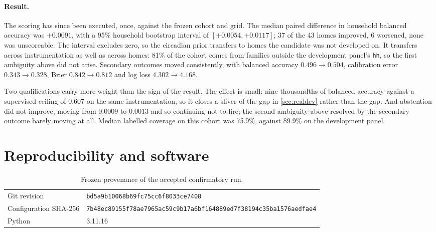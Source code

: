 \documentclass[11pt]{article}
\begin{document}
\paragraph{Result.}
The scoring has since been executed, once, against the frozen cohort and grid.
The median paired difference in household balanced accuracy was $+0.0091$, with
a 95\% household bootstrap interval of $[+0.0054, +0.0117]$; 37 of the 43 homes
improved, 6 worsened, none was unscoreable. The interval excludes zero, so the
circadian prior transfers to homes the candidate was not developed on. It
transfers across instrumentation as well as across homes: 81\% of the cohort
comes from families outside the development panel's \texttt{hh}, so the first
ambiguity
above did not arise. Secondary outcomes moved consistently, with balanced
accuracy $0.496\to0.504$, calibration error $0.343\to0.328$, Brier
$0.842\to0.812$ and log loss $4.302\to4.168$.

Two qualifications carry more weight than the sign of the result. The effect is
small: nine thousandths of balanced accuracy against a supervised ceiling of
0.607 on the same instrumentation, so it closes a sliver of the gap in
\cref{sec:realdev} rather than the gap. And abstention did not improve, moving
from $0.0009$ to $0.0013$ and so continuing not to fire; the second ambiguity
above resolved by the secondary outcome barely moving at all. Median labelled
coverage on this cohort was 75.9\%, against 89.9\% on the development panel.

\section{Reproducibility and software}


\begin{table}[h]
\centering
\small
\caption{Frozen provenance of the accepted confirmatory run.}
\label{tab:provenance}
\begin{tabular}{@{}l p{7.2cm}@{}}
\toprule
Git revision & \texttt{bd5a9b10\allowbreak 068b69fc\allowbreak 75cc6f80\allowbreak 69044306\allowbreak 33ce7408} \\
Configuration SHA-256 & \texttt{7b48ec89\allowbreak 155f78ae\allowbreak 7965ac59\allowbreak c9b17a6b\allowbreak f164889e\allowbreak d7f38194\allowbreak c35ba157\allowbreak 6aedfae4} \\
Python & 3.11.16 \\
\bottomrule
\end{tabular}
\end{table}
\end{document}
